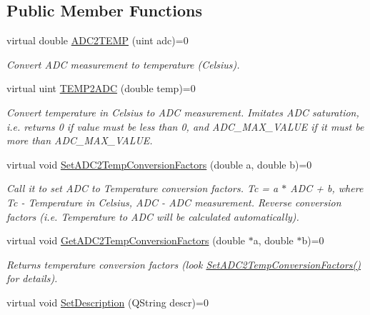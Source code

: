 \subsection*{Public Member Functions}
\begin{DoxyCompactItemize}
\item 
virtual double \hyperlink{class_interfaces_1_1_i_adc_temperature_convertor_aa6283c62cbbb012954b5e51d7a969385}{A\+D\+C2\+T\+E\+MP} (uint adc)=0
\begin{DoxyCompactList}\small\item\em Convert A\+DC measurement to temperature (Celsius). \end{DoxyCompactList}\item 
virtual uint \hyperlink{class_interfaces_1_1_i_adc_temperature_convertor_ab5d3453ecc41848b723a790fe7e01f79}{T\+E\+M\+P2\+A\+DC} (double temp)=0
\begin{DoxyCompactList}\small\item\em Convert temperature in Celsius to A\+DC measurement. Imitates A\+DC saturation, i.\+e. returns 0 if value must be less than 0, and A\+D\+C\+\_\+\+M\+A\+X\+\_\+\+V\+A\+L\+UE if it must be more than A\+D\+C\+\_\+\+M\+A\+X\+\_\+\+V\+A\+L\+UE. \end{DoxyCompactList}\item 
virtual void \hyperlink{class_interfaces_1_1_i_adc_temperature_convertor_a3e4c9204b3593bc434a041c7a69c430f}{Set\+A\+D\+C2\+Temp\+Conversion\+Factors} (double a, double b)=0
\begin{DoxyCompactList}\small\item\em Call it to set A\+DC to Temperature conversion factors. Tc = a $\ast$ A\+DC + b, where Tc -\/ Temperature in Celsius, A\+DC -\/ A\+DC measurement. Reverse conversion factors (i.\+e. Temperature to A\+DC will be calculated automatically). \end{DoxyCompactList}\item 
virtual void \hyperlink{class_interfaces_1_1_i_adc_temperature_convertor_a61cff0aa0590906acfb18c9b789dceb2}{Get\+A\+D\+C2\+Temp\+Conversion\+Factors} (double $\ast$a, double $\ast$b)=0
\begin{DoxyCompactList}\small\item\em Returns temperature conversion factors (look \hyperlink{class_interfaces_1_1_i_adc_temperature_convertor_a3e4c9204b3593bc434a041c7a69c430f}{Set\+A\+D\+C2\+Temp\+Conversion\+Factors()} for details). \end{DoxyCompactList}\item 
virtual void \hyperlink{class_interfaces_1_1_i_adc_temperature_convertor_a65bbef2300e21c495d95305921ddb74b}{Set\+Description} (Q\+String descr)=0

\end{DoxyCompactItemize}
